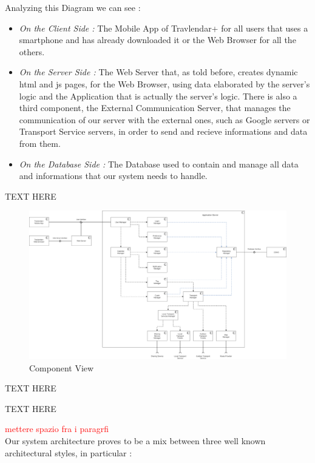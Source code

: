 Analyzing this Diagram we can see :
\begin{itemize}
	\setlength{\leftskip}{0.5cm}
	\item \emph{On the Client Side : }The Mobile App of Travlendar+ for all users that uses a smartphone and has already downloaded it or the Web Browser for all the others.
	\item \emph{On the Server Side : }The Web Server that, as told before, creates dynamic html and js pages, for the Web Browser, using data elaborated by the server's logic and the Application that is actually the server's logic. There is also a third component, the External Communication Server, that manages the communication of our server with the external ones, such as Google servers or Transport Service servers, in order to send and recieve informations and data from them.
	\item \emph{On the Database Side : }The Database used to contain and manage all data and informations that our system needs to handle.
\end{itemize}


TEXT HERE

\begin{figure}[H]
	\centering
	\includegraphics[scale=0.2]{Images/Architecture/Components_View}
	\caption{Component View}
\end{figure}


TEXT HERE


TEXT HERE


\textcolor{red}{\huge mettere spazio fra i paragrfi}\\
Our system architecture proves to be a mix between three well known architectural styles, in particular : 

